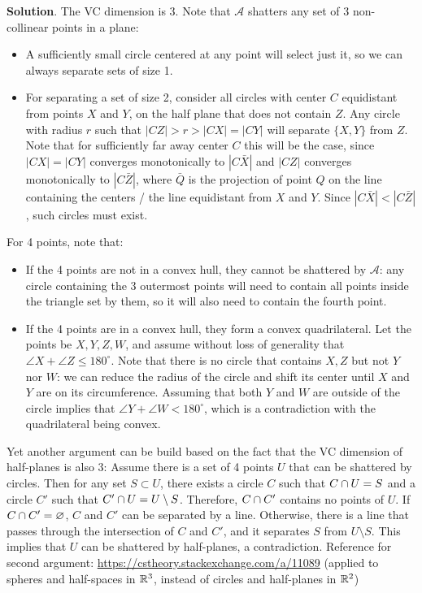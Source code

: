 \textbf{Solution}. The VC dimension is 3.
Note that \(\mathcal{A}\) shatters any set of 3 non-collinear points in
a plane:
\begin{itemize}[tightlist]
\item
  A sufficiently small circle centered at any point will select just it,
  so we can always separate sets of size 1.
\item
  For separating a set of size 2, consider all circles with center \(C\)
  equidistant from points \(X\) and \(Y\), on the half plane that does
  not contain \(Z\). Any circle with radius \(r\) such that
  \(|CZ| > r > |CX| = |CY|\) will separate \(\{ X, Y \}\) from \(Z\).
  Note that for sufficiently far away center \(C\) this will be the
  case, since \(|CX| = |CY|\) converges monotonically to
  \(|C\bar{X}|\) and \(|CZ|\) converges monotonically to
  \(|C\bar{Z}|\), where \(\bar{Q}\) is the projection of point
  \(Q\) on the line containing the centers / the line equidistant from
  \(X\) and \(Y\). Since \(|C\bar{X}| < |C\bar{Z}|\), such
  circles must exist.
\end{itemize}
For 4 points, note that:
\begin{itemize}[tightlist]
\item
  If the 4 points are not in a convex hull, they cannot be shattered by
  \(\mathcal{A}\): any circle containing the 3 outermost points will
  need to contain all points inside the triangle set by them, so it will
  also need to contain the fourth point.
\item
  If the 4 points are in a convex hull, they form a convex
  quadrilateral. Let the points be \(X, Y, Z, W\), and assume without
  loss of generality that \(\angle X + \angle Z \leq 180^\circ\). Note
  that there is no circle that contains \(X, Z\) but not \(Y\) nor
  \(W\): we can reduce the radius of the circle and shift its center
  until \(X\) and \(Y\) are on its circumference. Assuming that both
  \(Y\) and \(W\) are outside of the circle implies that
  \(\angle Y + \angle W < 180^\circ\), which is a contradiction with the
  quadrilateral being convex.
\end{itemize}
Yet another argument can be build based on the fact that the VC
dimension of half-planes is also 3: Assume there is a set of 4 points
\(U\) that can be shattered by circles. Then for any set
\(S \subset U\), there exists a circle \(C\) such that \(C \cap U = S\)
and a circle \(C'\) such that \(C' \cap U = U \setminus S\). Therefore,
\(C \cap C'\) contains no points of \(U\). If \(C \cap C' = \varnothing\),
\(C\) and \(C'\) can be separated by a line. Otherwise, there is a line
that passes through the intersection of \(C\) and \(C'\), and it
separates \(S\) from \(U \setminus S\). This implies that \(U\) can be
shattered by half-planes, a contradiction.
Reference for second argument:
\url{https://cstheory.stackexchange.com/a/11089} (applied to spheres and
half-spaces in \(\mathbb{R}^{3}\), instead of circles and half-planes in
\(\mathbb{R}^{2}\))


